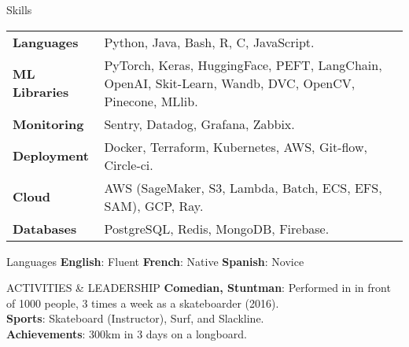 \documentclass{resume}
\begin{document}
\begin{multicols}{2}
	\begin{rSection}{\Large Skills}
		\noindent
		 \setlength{\tabcolsep}{2pt}
    \begin{tabularx}{0.49\textwidth}{@{\textbullet\hspace{\labelsep}}lX}
        \textbf{Languages} & Python, Java, Bash, R, C, JavaScript. \\
        \textbf{ML Libraries} & PyTorch, Keras, HuggingFace, PEFT, LangChain, OpenAI, Skit-Learn, Wandb, DVC, OpenCV, Pinecone, MLlib. \\
        \textbf{Monitoring} & Sentry, Datadog, Grafana, Zabbix. \\
        \textbf{Deployment} & Docker, Terraform, Kubernetes, AWS, Git-flow, Circle-ci. \\
        \textbf{Cloud} & AWS (SageMaker, S3, Lambda, Batch, ECS, EFS, SAM), GCP, Ray. \\
        \textbf{Databases} & PostgreSQL, Redis, MongoDB, Firebase. \\
    \end{tabularx}
	\end{rSection}

	\begin{rSection}{\Large Languages}
		\textbf{English}:  Fluent \hspace{1ex} \textbf{French}: Native \hspace{1ex} \textbf{Spanish}:  Novice
	\end{rSection}

	\begin{rSection}{\Large ACTIVITIES \& LEADERSHIP}
		\textbf{Comedian, Stuntman}: Performed in  in front of 1000 people, 3 times a week as a skateboarder (2016).\\
		\textbf{Sports}: Skateboard (Instructor), Surf, and Slackline.\\
		\textbf{Achievements}: 300km in 3 days on a longboard.
	\end{rSection}
	
	\end{multicols}
\end{document}
